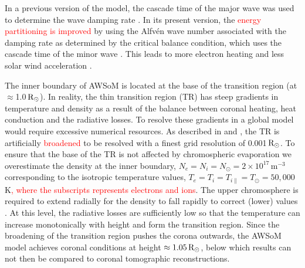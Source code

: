 \documentclass[namedreferences]{solarphysics}
\def\edit#1{\textcolor{Red}{#1}}
\newcommand{\mrsun}{{\rm R_\odot}}
\begin{document}
\begin{article}
{In a previous} version of the model, the cascade time of the major wave was used to determine the wave damping rate \citep{Cha2011, Van2014}. {In its present version, the \edit{energy partitioning is improved}} by using the Alfv\'{e}n wave number associated with the damping rate as determined by the critical balance condition, which uses the cascade time of the minor wave \citep{Lit2007}. This leads to more electron heating and less solar wind acceleration \citep{Van2019b}.

The inner boundary of AWSoM is located at the base of the transition region (at $\approx$1.0\,$\mrsun$). In reality, the thin {transition region (TR)} has steep gradients in temperature and density as a result of the balance between coronal heating, heat conduction and the radiative losses. To resolve these gradients in a global model would require excessive numerical resources. As described in \citet{Lio2009} and \citet{Sok2013}{, the TR is artificially \edit{broadened} to be resolved with a} finest grid resolution of 0.001\,$\mrsun$.  To ensure that the base of the TR is not affected by chromospheric evaporation we overestimate the density at the inner boundary, $N_{e}=N_{i}=N_{\odot} =2\times10^{17}$\,m$^{-3}$ corresponding to the isotropic temperature values, $T_{e}=T_{i}=T_{i\parallel}=T_{\odot}=50,000$\,K\edit{, where the subscripts represents electrons and ions}. The upper chromosphere is required to extend radially for the density to fall rapidly to correct (lower) values \citep{Lio2009}.  At this level, the radiative losses are sufficiently low so that the temperature can increase monotonically with height and form the transition region. Since the broadening of the transition region pushes the corona outwards, {the AWSoM model achieves coronal conditions at height $\approx 1.05\,\mrsun$, below which results can not then be compared to coronal tomographic reconstructions.}


\end{article}
\end{document}

